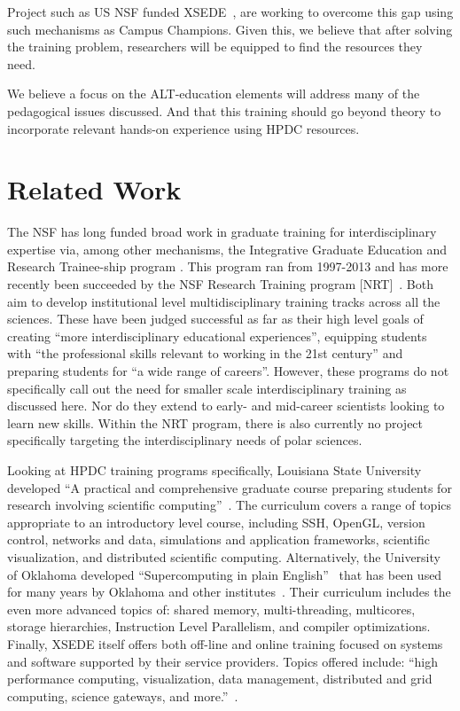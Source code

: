 \documentclass[conference]{IEEEtran}
\begin{document}
\begin{enumerate}[\setlength{\listparindent}{\parindent}]
Project such as US NSF funded XSEDE~\cite{noauthor_undated-lh}, are working to overcome this gap using such mechanisms as Campus Champions.  Given this, we believe that after solving the training problem, researchers will be equipped to find the resources they need. \end{enumerate} We believe a focus on the ALT-education elements will address many of the pedagogical issues discussed.  And that this training should go beyond theory to incorporate relevant hands-on experience using HPDC resources.

\section{Related Work}
The NSF has long funded broad work in graduate training for interdisciplinary expertise via, among other mechanisms, the Integrative Graduate Education and Research Trainee-ship program \cite{noauthor_undated-bu}.  This program ran from 1997-2013 and has more recently been succeeded by the NSF Research Training program [NRT]~\cite{NRT}.  Both aim to develop institutional level multidisciplinary training tracks across all the sciences. These have been judged successful as far as their high level goals of creating ``more interdisciplinary educational experiences'', equipping students with ``the professional skills relevant to working in the 21st century'' and preparing students for ``a wide range of careers''\cite{National2006}. However, these programs do not specifically call out the need for smaller scale interdisciplinary training as discussed here.  Nor do they extend to early- and mid-career scientists looking to learn new skills. Within the NRT program, there is also currently no project specifically targeting the interdisciplinary needs of polar sciences.

Looking at HPDC training programs specifically, Louisiana State University developed ``A practical and comprehensive graduate course preparing students for research involving scientific computing''~\cite{Allen2011-qx}. The curriculum covers a range of topics appropriate to an introductory level course, including SSH, OpenGL, version control, networks and data, simulations and application frameworks, scientific visualization, and distributed scientific computing. Alternatively, the University of Oklahoma  developed ``Supercomputing in plain English''~\cite{Neeman2002-dk} that has been used for many years by Oklahoma and other institutes~\cite{Neeman2008-mj}.  Their curriculum includes the even more advanced topics of: shared memory, multi-threading, multicores, storage hierarchies, Instruction Level Parallelism, and compiler optimizations.  Finally, XSEDE itself offers both off-line and online training focused on systems and software supported by their service providers. Topics offered include: ``high performance computing, visualization, data management, distributed and grid computing, science gateways, and more.''~\cite{noauthor_undated-ht}.  
\end{document}

